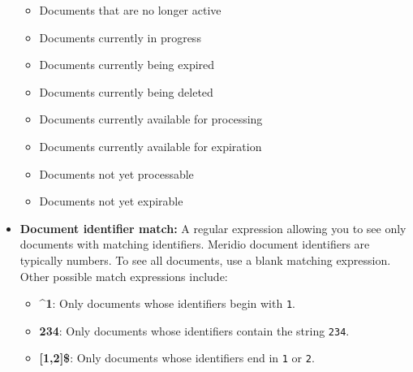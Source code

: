 \begin{changemargin}{1.5in}{0in}
\begin{itemize}
\begin{itemize}
\item Documents that are no longer active

\item Documents currently in progress

\item Documents currently being expired

\item Documents currently being deleted

\item Documents currently available for processing

\item Documents currently available for expiration

\item Documents not yet processable

\item Documents not yet expirable

\end{itemize}

\item \textbf{Document identifier match:} A regular expression
allowing you to see only documents with matching identifiers. Meridio
document identifiers are typically numbers. To see all documents, use
a blank matching expression. Other possible match expressions include:

\begin{itemize}

\item \textbf{\^{}1}: Only documents whose identifiers begin with \texttt{1}.

\item \textbf{234}: Only documents whose identifiers contain the
string \texttt{234}.

\item \textbf{[1,2]\$}: Only documents whose identifiers end in
\texttt{1} or \texttt{2}.

\end{itemize}




\end{itemize}
\end{changemargin}
